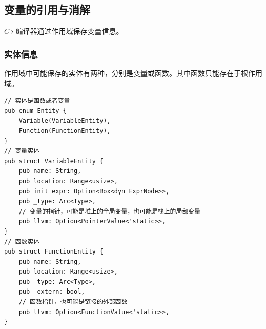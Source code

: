 \documentclass{ctexrep}
\newcommand{\cb}{$C\,\flat$\xspace}
\begin{document}
\subsection{变量的引用与消解}
\cb 编译器通过作用域保存变量信息。
\subsubsection{实体信息}
作用域中可能保存的实体有两种，分别是变量或函数。其中函数只能存在于根作用域。
\begin{verbatim}
// 实体是函数或者变量
pub enum Entity {
    Variable(VariableEntity),
    Function(FunctionEntity),
}
// 变量实体
pub struct VariableEntity {
    pub name: String,
    pub location: Range<usize>,
    pub init_expr: Option<Box<dyn ExprNode>>,
    pub _type: Arc<Type>,
    // 变量的指针，可能是堆上的全局变量，也可能是栈上的局部变量
    pub llvm: Option<PointerValue<'static>>,
}
// 函数实体
pub struct FunctionEntity {
    pub name: String,
    pub location: Range<usize>,
    pub _type: Arc<Type>,
    pub _extern: bool,
    // 函数指针，也可能是链接的外部函数
    pub llvm: Option<FunctionValue<'static>>,
}
\end{verbatim}
\end{document}
